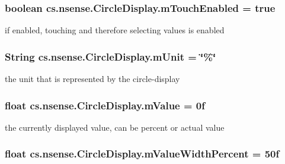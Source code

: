 \hypertarget{classcs_1_1nsense_1_1_circle_display_ad66f0833e4072a0e0db4668fe24c351b}{
\subsubsection[{m\-Touch\-Enabled}]{\setlength{\rightskip}{0pt plus 5cm}boolean cs.\-nsense.\-Circle\-Display.\-m\-Touch\-Enabled = true\hspace{0.3cm}{\ttfamily [private]}}}\label{classcs_1_1nsense_1_1_circle_display_ad66f0833e4072a0e0db4668fe24c351b}
if enabled, touching and therefore selecting values is enabled \hypertarget{classcs_1_1nsense_1_1_circle_display_ac945e1cfc35dacdcb6ccbc99b0eca67d}{
\subsubsection[{m\-Unit}]{\setlength{\rightskip}{0pt plus 5cm}String cs.\-nsense.\-Circle\-Display.\-m\-Unit = \char`\"{}\%\char`\"{}\hspace{0.3cm}{\ttfamily [private]}}}\label{classcs_1_1nsense_1_1_circle_display_ac945e1cfc35dacdcb6ccbc99b0eca67d}
the unit that is represented by the circle-\/display \hypertarget{classcs_1_1nsense_1_1_circle_display_a2992f519bc078e9f182ae02ce303ae88}{
\subsubsection[{m\-Value}]{\setlength{\rightskip}{0pt plus 5cm}float cs.\-nsense.\-Circle\-Display.\-m\-Value = 0f\hspace{0.3cm}{\ttfamily [private]}}}\label{classcs_1_1nsense_1_1_circle_display_a2992f519bc078e9f182ae02ce303ae88}
the currently displayed value, can be percent or actual value \hypertarget{classcs_1_1nsense_1_1_circle_display_ae8ada5da75894dde3b3e14579b3f447c}{
\subsubsection[{m\-Value\-Width\-Percent}]{\setlength{\rightskip}{0pt plus 5cm}float cs.\-nsense.\-Circle\-Display.\-m\-Value\-Width\-Percent = 50f\hspace{0.3cm}{\ttfamily [private]}}}\label{classcs_1_1nsense_1_1_circle_display_ae8ada5da75894dde3b3e14579b3f447c}
